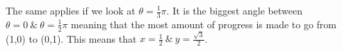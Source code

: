 \documentclass[preview]{standalone}
\begin{document}
\begin{center}
The same applies if we look at $\theta = \frac{1}{3} \pi$. It is the biggest angle between $\theta = 0 \ \& \ \theta = \frac{1}{2} \pi$ meaning that the most amount of progress is made to go from (1,0) to (0,1). This means that $x = \frac{1}{2} \ \& \ y = \frac{\sqrt{3}}{2}$.
\end{center}
\end{document}
